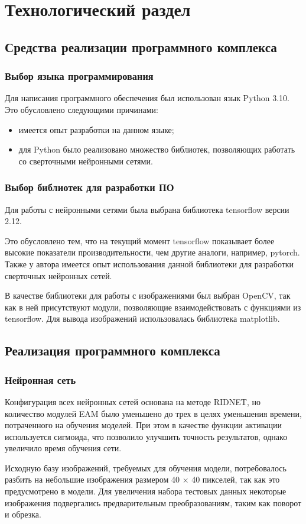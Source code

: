 \section{Технологический раздел}


\subsection{Средства реализации программного комплекса}


\subsubsection{Выбор языка программирования}
Для написания программного обеспечения был использован язык Python 3.10.
Это обусловлено следующими причинами:
\begin{itemize}
	\item имеется опыт разработки на данном языке;
	\item для Python было реализовано множество библиотек, позволяющих работать со сверточными нейронными сетями.
\end{itemize}

\subsubsection{Выбор библиотек для разработки ПО}
Для работы с нейронными сетями была выбрана библиотека tensorflow версии 2.12.

Это обусловлено тем, что на текущий момент tensorflow показывает более высокие показатели производительности, чем другие аналоги, например, pytorch.
Также у автора имеется опыт использования данной библиотеки для разработки сверточных нейронных сетей.

В качестве библиотеки для работы с изображениями был выбран OpenCV, так как в ней присутствуют модули, позволяющие взаимодействовать с функциями из tensorflow.
Для вывода изображений использовалась библиотека matplotlib. 

\subsection{Реализация программного комплекса}

\subsubsection{Нейронная сеть}
Конфигурация всех нейронных сетей основана на методе RIDNET, но количество модулей EAM было уменьшено до трех в целях уменьшения времени, потраченного на обучения моделей.
При этом в качестве функции активации используется сигмоида, что позволило улучшить точность результатов, однако увеличило время обучения сети.

Исходную базу изображений, требуемых для обучения модели, потребовалось разбить на небольшие изображения размером 40 × 40 пикселей, так как это предусмотрено в модели. 
Для увеличения набора тестовых данных некоторые изображения подвергались предварительным преобразованиям, таким как поворот и обрезка.